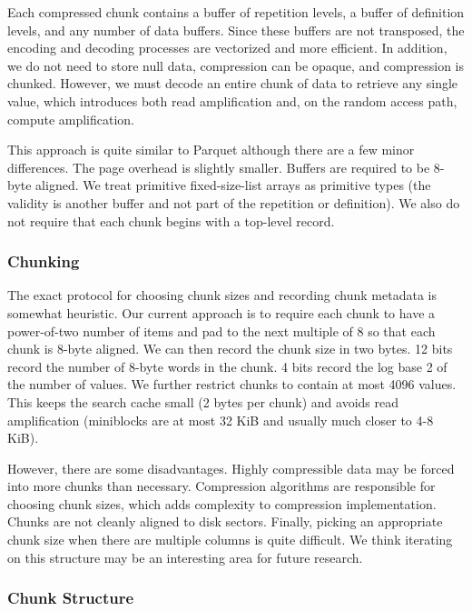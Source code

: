 \documentclass[sigconf, nonacm]{acmart}
\begin{document}
Each compressed chunk contains a buffer of repetition levels, a buffer of definition levels, and any number of data buffers.  Since these buffers are not transposed, the encoding and decoding processes are vectorized and more efficient.  In addition, we do not need to store null data, compression can be opaque, and compression is chunked.  However, we must decode an entire chunk of data to retrieve any single value, which introduces both read amplification and, on the random access path, compute amplification.

This approach is quite similar to Parquet although there are a few minor differences.  The page overhead is slightly smaller.  Buffers are required to be 8-byte aligned.  We treat primitive fixed-size-list arrays as primitive types (the validity is another buffer and not part of the repetition or definition).  We also do not require that each chunk begins with a top-level record.

\subsubsection{Chunking}

The exact protocol for choosing chunk sizes and recording chunk metadata is somewhat heuristic.  Our current approach is to require each chunk to have a power-of-two number of items and pad to the next multiple of 8 so that each chunk is 8-byte aligned.  We can then record the chunk size in two bytes.  12 bits record the number of 8-byte words in the chunk.  4 bits record the log base 2 of the number of values.  We further restrict chunks to contain at most 4096 values.  This keeps the search cache small (2 bytes per chunk) and avoids read amplification (miniblocks are at most 32 KiB and usually much closer to 4-8 KiB).

However, there are some disadvantages.  Highly compressible data may be forced into more chunks than necessary.  Compression algorithms are responsible for choosing chunk sizes, which adds complexity to compression implementation.  Chunks are not cleanly aligned to disk sectors.  Finally, picking an appropriate chunk size when there are multiple columns is quite difficult.  We think iterating on this structure may be an interesting area for future research.

\subsubsection{Chunk Structure}
\end{document}
